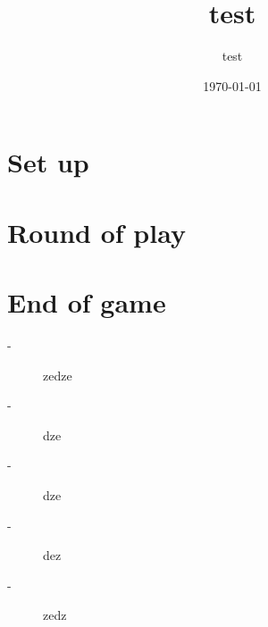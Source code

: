 \documentclass{article}%
\title{test}%
\author{test}%
\date{\today}%
\begin{document}
%
\pagestyle{empty}%
\normalsize%
\maketitle%
\section{ Set up
}%
\label{sec:Setup}%

%
\section{ Round of play
}%
\label{sec:Roundofplay}%

%
\section{ End of game
}%
\label{sec:Endofgame}%
\begin{description}%
\item[{-} ]%
%
 zedze
%
\item[{-} ]%
%
 dze
%
\item[{-} ]%
%
 dze
%
\item[{-} ]%
%
 dez
%
\item[{-} ]%
%
 zedz%
\end{description}

%
\end{document}
